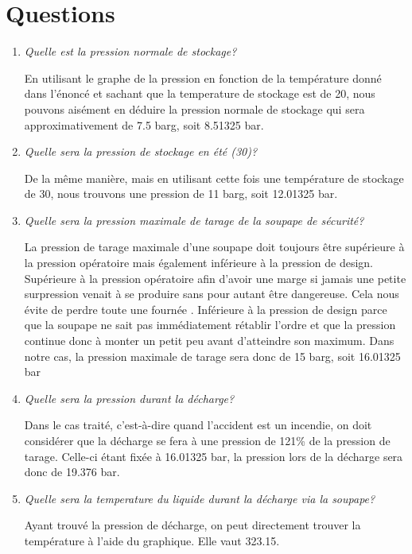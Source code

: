 \documentclass{report}
\begin{document}
\section*{Questions}
\begin{enumerate}
\item\textit{Quelle est la pression normale de stockage?}

En utilisant le graphe de la pression en fonction de la température donné dans l'énoncé et sachant que la temperature de stockage est de 20\celsius , nous pouvons aisément en déduire la pression normale de stockage qui sera approximativement de 7.5 barg, soit 8.51325 bar.

\item\textit{Quelle sera la pression de stockage en été (30\celsius)?}

De la même manière, mais en utilisant cette fois une température de stockage de 30\celsius , nous trouvons une pression de 11 barg, soit 12.01325 bar.

\item\textit{Quelle sera la pression maximale de tarage de la soupape de sécurité?}

La pression de tarage maximale d'une soupape doit toujours être supérieure à la pression opératoire mais également inférieure à la pression de design. Supérieure à la pression opératoire afin d'avoir une marge si jamais une petite surpression venait à se produire sans pour autant être dangereuse. Cela nous évite de perdre toute une \og fournée \fg. Inférieure à la pression de design parce que la soupape ne sait pas immédiatement rétablir l'ordre et que la pression continue donc à monter un petit peu avant d'atteindre son maximum. 
Dans notre cas, la pression maximale de tarage sera donc de 15 barg, soit 16.01325 bar 

\item\textit{Quelle sera la pression durant la décharge?}

Dans le cas traité, c'est-à-dire quand l'accident est un incendie, on doit considérer que la décharge se fera à une pression de 121\% de la pression de tarage. Celle-ci étant fixée à 16.01325 bar, la pression lors de la décharge sera donc de 19.376 bar.

\item\textit{Quelle sera la temperature du liquide durant la décharge via la soupape?}

Ayant trouvé la pression de décharge, on peut directement trouver la température à l'aide du graphique. Elle vaut 323.15\kelvin.


\end{enumerate}
\end{document}
